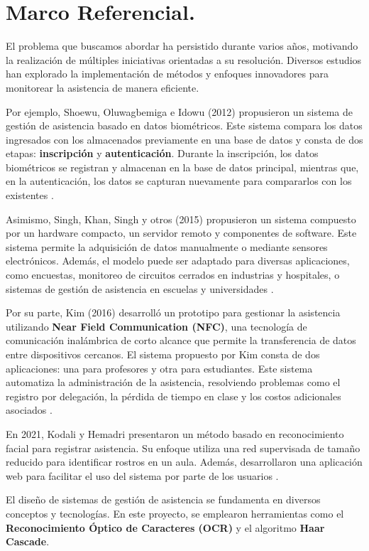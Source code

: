 \documentclass[12pt, letterpaper]{article}
\begin{document}
\section{Marco Referencial.}
El problema que buscamos abordar ha persistido durante varios años, motivando la realización de múltiples iniciativas orientadas a su resolución. Diversos estudios han explorado la implementación de métodos y enfoques innovadores para monitorear la asistencia de manera eficiente. 


Por ejemplo, Shoewu, Oluwagbemiga e Idowu (2012) propusieron un sistema de gestión de asistencia basado en datos biométricos. Este sistema compara los datos ingresados con los almacenados previamente en una base de datos y consta de dos etapas: \textbf{inscripción} y \textbf{autenticación}. Durante la inscripción, los datos biométricos se registran y almacenan en la base de datos principal, mientras que, en la autenticación, los datos se capturan nuevamente para compararlos con los existentes \cite{b4}. 

Asimismo, Singh, Khan, Singh y otros (2015) propusieron un sistema compuesto por un hardware compacto, un servidor remoto y componentes de software. Este sistema permite la adquisición de datos manualmente o mediante sensores electrónicos. Además, el modelo puede ser adaptado para diversas aplicaciones, como encuestas, monitoreo de circuitos cerrados en industrias y hospitales, o sistemas de gestión de asistencia en escuelas y universidades \cite{b5}.

Por su parte, Kim (2016) desarrolló un prototipo para gestionar la asistencia utilizando \textbf{Near Field Communication (NFC)}, una tecnología de comunicación inalámbrica de corto alcance que permite la transferencia de datos entre dispositivos cercanos. El sistema propuesto por Kim consta de dos aplicaciones: una para profesores y otra para estudiantes. Este sistema automatiza la administración de la asistencia, resolviendo problemas como el registro por delegación, la pérdida de tiempo en clase y los costos adicionales asociados \cite{b6}.

En 2021, Kodali y Hemadri presentaron un método basado en reconocimiento facial para registrar asistencia. Su enfoque utiliza una red supervisada de tamaño reducido para identificar rostros en un aula. Además, desarrollaron una aplicación web para facilitar el uso del sistema por parte de los usuarios \cite{b1}.

El diseño de sistemas de gestión de asistencia se fundamenta en diversos conceptos y tecnologías. En este proyecto, se emplearon herramientas como el \textbf{Reconocimiento Óptico de Caracteres (OCR)} y el algoritmo \textbf{Haar Cascade}.
\end{document}
